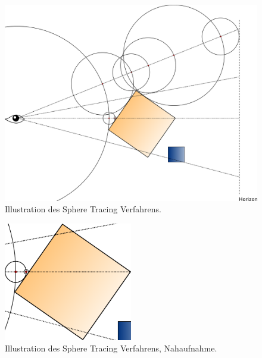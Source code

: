 \begin{figure}[H]
    \caption{Illustration des Sphere Tracing Verfahrens.\protect\footnotemark}\label{fig:sphere_tracing_1}
    \centering
    \includegraphics[width=1.0\textwidth]{img/sphere_tracing_principle.png}
\end{figure}
\begin{figure}[H]
    \caption{Illustration des Sphere Tracing Verfahrens, Nahaufnahme.\protect\footnotemark}\label{fig:sphere_tracing_2}
    \centering
    \includegraphics[width=0.5\textwidth]{img/sphere_tracing_principle_1.png}
\end{figure}
